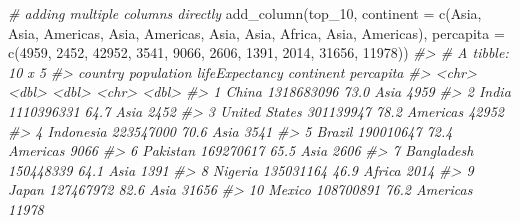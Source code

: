 \documentclass[
]{book}
\newenvironment{Shaded}{\begin{snugshade}}{\end{snugshade}}
\newcommand{\AttributeTok}[1]{\textcolor[rgb]{0.77,0.63,0.00}{#1}}
\newcommand{\CommentTok}[1]{\textcolor[rgb]{0.56,0.35,0.01}{\textit{#1}}}
\newcommand{\DecValTok}[1]{\textcolor[rgb]{0.00,0.00,0.81}{#1}}
\newcommand{\FunctionTok}[1]{\textcolor[rgb]{0.00,0.00,0.00}{#1}}
\newcommand{\NormalTok}[1]{#1}
\newcommand{\StringTok}[1]{\textcolor[rgb]{0.31,0.60,0.02}{#1}}
\begin{document}
\begin{Shaded}
\begin{Highlighting}[]
\CommentTok{\# adding multiple columns directly}
\FunctionTok{add\_column}\NormalTok{(top\_10, }
           \AttributeTok{continent =} \FunctionTok{c}\NormalTok{(}\StringTok{\textquotesingle{}Asia\textquotesingle{}}\NormalTok{, }\StringTok{\textquotesingle{}Asia\textquotesingle{}}\NormalTok{, }\StringTok{\textquotesingle{}Americas\textquotesingle{}}\NormalTok{, }\StringTok{\textquotesingle{}Asia\textquotesingle{}}\NormalTok{, }\StringTok{\textquotesingle{}Americas\textquotesingle{}}\NormalTok{, }
                         \StringTok{\textquotesingle{}Asia\textquotesingle{}}\NormalTok{, }\StringTok{\textquotesingle{}Asia\textquotesingle{}}\NormalTok{, }\StringTok{\textquotesingle{}Africa\textquotesingle{}}\NormalTok{, }\StringTok{\textquotesingle{}Asia\textquotesingle{}}\NormalTok{, }\StringTok{\textquotesingle{}Americas\textquotesingle{}}\NormalTok{),}
           \AttributeTok{percapita =} \FunctionTok{c}\NormalTok{(}\DecValTok{4959}\NormalTok{, }\DecValTok{2452}\NormalTok{, }\DecValTok{42952}\NormalTok{, }\DecValTok{3541}\NormalTok{, }\DecValTok{9066}\NormalTok{, }\DecValTok{2606}\NormalTok{, }\DecValTok{1391}\NormalTok{, }\DecValTok{2014}\NormalTok{, }\DecValTok{31656}\NormalTok{, }\DecValTok{11978}\NormalTok{))}
\CommentTok{\#\textgreater{} \# A tibble: 10 x 5}
\CommentTok{\#\textgreater{}    country       population lifeExpectancy continent percapita}
\CommentTok{\#\textgreater{}    \textless{}chr\textgreater{}              \textless{}dbl\textgreater{}          \textless{}dbl\textgreater{} \textless{}chr\textgreater{}         \textless{}dbl\textgreater{}}
\CommentTok{\#\textgreater{}  1 China         1318683096           73.0 Asia           4959}
\CommentTok{\#\textgreater{}  2 India         1110396331           64.7 Asia           2452}
\CommentTok{\#\textgreater{}  3 United States  301139947           78.2 Americas      42952}
\CommentTok{\#\textgreater{}  4 Indonesia      223547000           70.6 Asia           3541}
\CommentTok{\#\textgreater{}  5 Brazil         190010647           72.4 Americas       9066}
\CommentTok{\#\textgreater{}  6 Pakistan       169270617           65.5 Asia           2606}
\CommentTok{\#\textgreater{}  7 Bangladesh     150448339           64.1 Asia           1391}
\CommentTok{\#\textgreater{}  8 Nigeria        135031164           46.9 Africa         2014}
\CommentTok{\#\textgreater{}  9 Japan          127467972           82.6 Asia          31656}
\CommentTok{\#\textgreater{} 10 Mexico         108700891           76.2 Americas      11978}


\end{Highlighting}
\end{Shaded}
\end{document}
